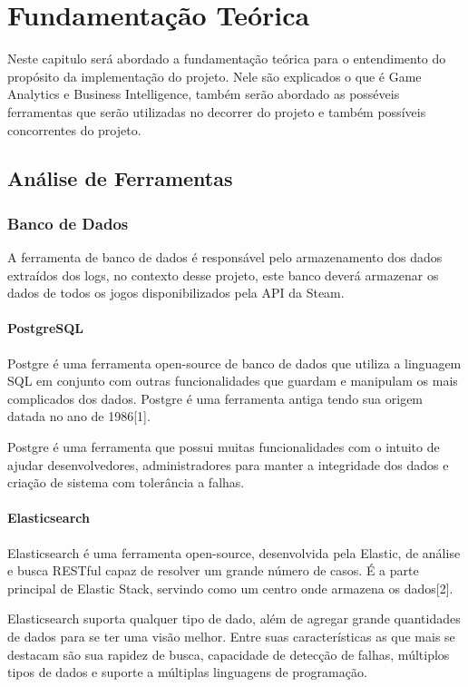 \chapter*[Fundamentação Teórica]{Fundamentação Teórica}
Neste capitulo será abordado a fundamentação teórica para o entendimento do propósito da implementação do projeto. Nele são explicados o que é Game Analytics e Business Intelligence, também serão abordado as posséveis ferramentas que serão utilizadas no decorrer do projeto e também possíveis concorrentes do projeto.
\section*{Análise de Ferramentas}
	\subsection*{Banco de Dados}
		A ferramenta de banco de dados é responsável pelo armazenamento dos dados extraídos dos logs, no contexto desse projeto, este banco deverá armazenar os dados de todos os jogos disponibilizados pela API da Steam.
			\subsubsection*{PostgreSQL}
			Postgre é uma ferramenta open-source de banco de dados que utiliza a linguagem SQL em conjunto com outras funcionalidades que guardam e manipulam os mais complicados dos dados. Postgre é uma ferramenta antiga tendo sua origem datada no ano de 1986[1].

    		Postgre é uma ferramenta que possui muitas funcionalidades com o intuito de ajudar desenvolvedores, administradores para manter a integridade dos dados e criação de sistema com tolerância a falhas.
			\subsubsection*{Elasticsearch}
			Elasticsearch é uma ferramenta open-source, desenvolvida pela Elastic, de análise e busca RESTful capaz de resolver um grande número de casos. É a parte principal de Elastic Stack, servindo como um centro onde armazena os dados[2].

    		Elasticsearch suporta qualquer tipo de dado, além de agregar grande quantidades de dados para se ter uma visão melhor. Entre suas características as que mais se destacam são sua rapidez de busca, capacidade de detecção de falhas, múltiplos tipos de dados e suporte a múltiplas linguagens de programação.
